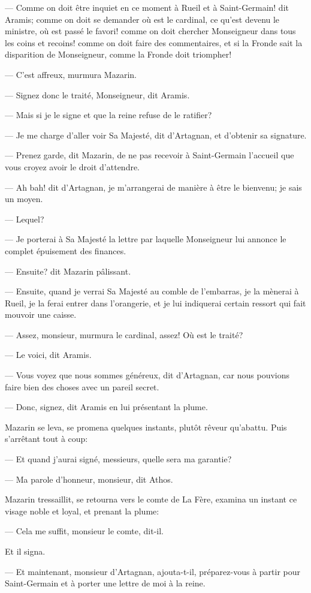 — Comme on doit être inquiet en ce moment à Rueil et à Saint-Germain! dit Aramis; comme on doit se demander où est le cardinal, ce qu'est devenu le ministre, où est passé le favori! comme on doit chercher Monseigneur dans tous les coins et recoins! comme on doit faire des commentaires, et si la Fronde sait la disparition de Monseigneur, comme la Fronde doit triompher!

— C'est affreux, murmura Mazarin.

— Signez donc le traité, Monseigneur, dit Aramis.

— Mais si je le signe et que la reine refuse de le ratifier?

— Je me charge d'aller voir Sa Majesté, dit d'Artagnan, et d'obtenir sa signature.

— Prenez garde, dit Mazarin, de ne pas recevoir à Saint-Germain l'accueil que vous croyez avoir le droit d'attendre.

— Ah bah! dit d'Artagnan, je m'arrangerai de manière à être le bienvenu; je sais un moyen.

— Lequel?

— Je porterai à Sa Majesté la lettre par laquelle Monseigneur lui annonce le complet épuisement des finances.

— Ensuite? dit Mazarin pâlissant.

— Ensuite, quand je verrai Sa Majesté au comble de l'embarras, je la mènerai à Rueil, je la ferai entrer dans l'orangerie, et je lui indiquerai certain ressort qui fait mouvoir une caisse.

— Assez, monsieur, murmura le cardinal, assez! Où est le traité?

— Le voici, dit Aramis.

— Vous voyez que nous sommes généreux, dit d'Artagnan, car nous pouvions faire bien des choses avec un pareil secret.

— Donc, signez, dit Aramis en lui présentant la plume.

Mazarin se leva, se promena quelques instants, plutôt rêveur qu'abattu. Puis s'arrêtant tout à coup:

— Et quand j'aurai signé, messieurs, quelle sera ma garantie?

— Ma parole d'honneur, monsieur, dit Athos.

Mazarin tressaillit, se retourna vers le comte de La Fère, examina un instant ce visage noble et loyal, et prenant la plume:

— Cela me suffit, monsieur le comte, dit-il.

Et il signa.

— Et maintenant, monsieur d'Artagnan, ajouta-t-il, préparez-vous à partir pour Saint-Germain et à porter une lettre de moi à la reine.